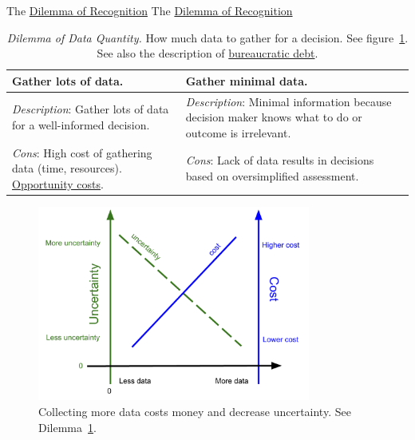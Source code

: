 The \href{table:recognition-obscurity}{Dilemma of Recognition}
The \href{table:recognition-obscurity}{Dilemma of Recognition}


\begin{center}
\begin{table}[H] %
\begin{tabular}{ | m{\dilemmatablewidth}| m{\dilemmatablewidth} | } 
  \hline
  \textbf{Gather lots of data.} &
  \textbf{Gather minimal data.} \\
  \hline
  \textit{Description}: Gather lots of data for a well-informed decision. &
  \textit{Description}: Minimal information because decision maker knows what to do or outcome is irrelevant.  \\  
  \hline
  \textit{Cons}: High cost of gathering data (time, resources). \href{https://en.wikipedia.org/wiki/Opportunity_cost}{Opportunity costs}. & 
  \textit{Cons}: Lack of data results in decisions based on oversimplified assessment. \\
  \hline
\end{tabular}
\caption{
\textit{Dilemma of Data Quantity.}
How much data to gather for a decision. See figure~\ref{fig:data_collection_cost_uncertainty}. See also the description of 
 \hyperref[sec:bureaucratic-debt]{bureaucratic debt}.
}
\label{table:gather-data-lots-vs-little}
\end{table}
\end{center}

\begin{figure}[H] %
        \centering
        \includegraphics[width=0.8\textwidth]{images/cost_and_uncertainty_for_data_collection}
        \caption{Collecting more data costs money and decrease uncertainty. See Dilemma~\ref{table:gather-data-lots-vs-little}.}
        \label{fig:data_collection_cost_uncertainty}
\end{figure}


